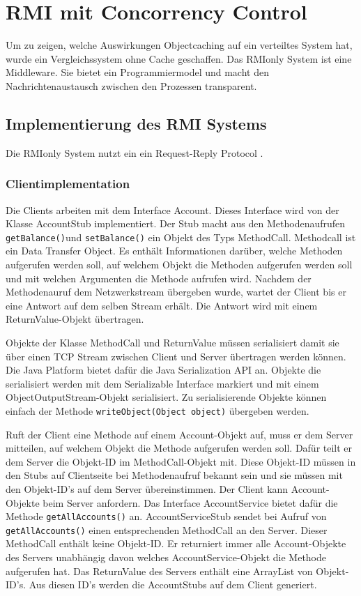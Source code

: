 \chapter{RMI mit Concorrency Control}

Um zu zeigen, welche Auswirkungen Objectcaching auf ein verteiltes
System hat, wurde ein Vergleichssystem ohne Cache geschaffen. Das
RMIonly System ist eine Middleware. Sie bietet ein Programmiermodel
und macht den Nachrichtenaustausch zwischen den Prozessen transparent.

\section{Implementierung des RMI Systems}
\label{sec:impl-des-eigen}

Die RMIonly System nutzt ein ein Request-Reply Protocol
\cite{coulouris88}.

\subsection{Clientimplementation}
\label{sec:clientimplementation}

Die Clients arbeiten mit dem Interface Account. Dieses Interface wird
von der Klasse AccountStub implementiert. Der Stub macht aus den
Methodenaufrufen
\verb|getBalance()|und \verb|setBalance()| ein Objekt des Typs
MethodCall. Methodcall ist ein Data Transfer Object. Es enthält
Informationen darüber, welche Methoden aufgerufen werden soll, auf
welchem Objekt die Methoden aufgerufen werden soll und mit welchen
Argumenten die Methode aufrufen wird. Nachdem der Methodenauruf dem
Netzwerkstream übergeben wurde, wartet der Client bis er eine Antwort
auf dem selben Stream erhält. Die Antwort wird mit einem
ReturnValue-Objekt übertragen.

Objekte der Klasse MethodCall und ReturnValue müssen serialisiert
da\-mit sie über einen TCP Stream zwischen Client und Server übertragen
werden können. Die Java Platform bietet dafür die Java Serialization
API an. Objekte die serialisiert werden mit dem Serializable Interface
markiert und mit einem ObjectOutputStream-Objekt serialisiert. Zu
serialisierende Objekte können einfach der Methode
\verb|writeObject(Object object)| übergeben werden.

Ruft der Client eine Methode auf einem Account-Objekt auf, muss er dem
Server mitteilen, auf welchem Objekt die Methode aufgerufen werden
soll. Dafür teilt er dem Server die Objekt-ID im MethodCall-Objekt
mit. Diese Objekt-ID müssen in den Stubs auf Clientseite bei
Methodenaufruf bekannt sein und sie müssen mit den Objekt-ID's auf dem
Server übereinstimmen. Der Client kann Account-Objekte beim Server
anfordern. Das Interface AccountService bietet dafür die Methode
\verb|getAllAccounts()| an. AccountServiceStub
sendet bei Aufruf von \verb|getAllAccounts()|
einen entsprechenden MethodCall an den Server. Dieser MethodCall
enthält keine Objekt-ID. Er returniert immer alle Account-Objekte des
Servers unabhängig davon welches AccountService-Objekt die Methode
aufgerufen hat. Das ReturnValue des Servers enthält eine ArrayList von
Objekt-ID's. Aus diesen ID's werden die AccountStubs auf dem Client generiert.

